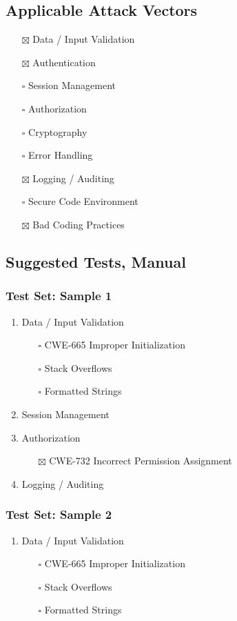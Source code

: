 \documentclass[11pt]{article}
\begin{document}
\subsection{Applicable Attack Vectors}
\label{sec:orgfc96519}
\begin{itemize}
\item[{$\boxtimes$}] Data / Input Validation
\item[{$\boxtimes$}] Authentication
\item[{$\square$}] Session Management
\item[{$\square$}] Authorization
\item[{$\square$}] Cryptography
\item[{$\square$}] Error Handling
\item[{$\boxtimes$}] Logging / Auditing
\item[{$\square$}] Secure Code Environment
\item[{$\boxtimes$}] Bad Coding Practices
\end{itemize}
\subsection{Suggested Tests, Manual}
\label{sec:org82e41ed}
\subsubsection{Test Set: Sample 1}
\label{sec:org2be392d}
\begin{enumerate}
\item Data / Input Validation
\label{sec:org499d138}
\begin{itemize}
\item[{$\square$}] CWE-665 Improper Initialization
\item[{$\square$}] Stack Overflows
\item[{$\square$}] Formatted Strings
\end{itemize}
\item Session Management
\label{sec:orga149cb8}
\item Authorization
\label{sec:orgcd7966a}
\begin{itemize}
\item[{$\boxtimes$}] CWE-732 Incorrect Permission Assignment
\end{itemize}
\item Logging / Auditing
\label{sec:orgca008f0}
\end{enumerate}
\subsubsection{Test Set: Sample 2}
\label{sec:org5754780}
\begin{enumerate}
\item Data / Input Validation
\label{sec:orgb005918}
\begin{itemize}
\item[{$\square$}] CWE-665 Improper Initialization
\item[{$\square$}] Stack Overflows
\item[{$\square$}] Formatted Strings
\end{itemize}
\end{enumerate}
\end{document}
